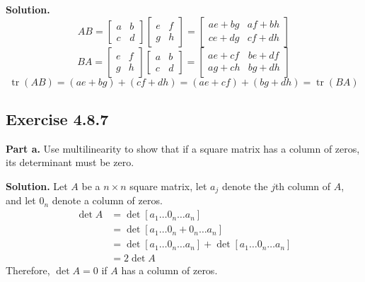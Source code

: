 \documentclass[12pt]{article}
\begin{document}
\medskip

\textbf{Solution.}
\[
        AB = 
        \begin{bmatrix}
            a & b\\
            c & d
        \end{bmatrix}
        \begin{bmatrix}
            e & f\\
            g & h
        \end{bmatrix} =
        \begin{bmatrix}
            ae+bg & af+bh\\
            ce+dg & cf+dh
        \end{bmatrix}
    \]
    \[
        BA = 
        \begin{bmatrix}
            e & f\\
            g & h
        \end{bmatrix}
        \begin{bmatrix}
            a & b\\
            c & d
        \end{bmatrix} =
        \begin{bmatrix}
            ae+cf & be+df\\
            ag+ch & bg+dh
        \end{bmatrix}
    \]
    \[
        \operatorname{tr}(AB)
        = (ae+bg) + (cf+dh)
        = (ae+cf) + (bg+dh)
        = \operatorname{tr}(BA)
    \]
\newpage









\subsection*{Exercise 4.8.7}
\textbf{Part a.}
Use multilinearity to show that if a square matrix has a column of zeros, its determinant must be zero.
\medskip

\textbf{Solution.}
Let $A$ be a $n\times n$ square matrix, 
    let $a_j$ denote the $j$th column of $A$,
    and let $0_n$ denote a column of zeros.
    \begin{align*}
        \det A
        &= \det [a_1 \hdots 0_n \hdots a_n] \\
        &= \det [a_1 \hdots 0_n + 0_n \hdots a_n] \\
        &= \det [a_1 \hdots 0_n \hdots a_n] + \det [a_1 \hdots 0_n \hdots a_n] \\
        &= 2 \det A
    \end{align*}
    Therefore, $\det A = 0$ if $A$ has a column of zeros.
\bigskip
\end{document}
